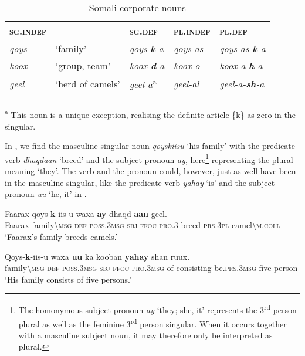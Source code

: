 \documentclass[output=paper]{langsci/langscibook}
\begin{document}
\begin{table}
\caption{Somali corporate nouns}
\label{tab:14}
\begin{tabularx}{\textwidth}{XXXXX}
\lsptoprule
{\textsc{sg.indef}} &  & {\textsc{sg.def}} & {\textsc{pl.indef}} & {\textsc{pl.def}}\\
\midrule 
{\textit{qoys}} & {‘family’} & {\textit{qoys-}\textbf{\textit{k}}\textit{-a}} & {\textit{qoys-as}} & {\textit{qoys-as-}\textbf{\textit{k}}\textit{-a}}\\
{\textit{koox}} & {‘group, team’} & {\textit{koox-}\textbf{\textit{d}}\textit{-a}} & {\textit{koox-o}} & {\textit{koox-a-}\textbf{\textit{h}}\textit{-a}}\\
{\textit{geel}} & {‘herd of camels’} & {\textit{geel-a}\textsuperscript{a}} & {\textit{geel-al}} & {\textit{geel-a-}\textbf{\textit{sh}}\textit{-a}}\\
\lspbottomrule
\end{tabularx}

\end{table} 


\textsuperscript{a} This noun is a unique exception, realising the definite article \{k\} as zero in the singular.

In , we find the masculine singular noun \textit{qoyskiisu} ‘his family’ with the predicate verb \textit{dhaqdaan} ‘breed’ and the subject pronoun \textit{ay}, here\footnote{The homonymous subject pronoun \textit{ay} ‘they; she, it’ represents the 3\textsuperscript{rd} person plural as well as the feminine 3\textsuperscript{rd} person singular. When it occurs together with a masculine subject noun, it may therefore only be interpreted as plural.} representing the plural meaning ‘they’. The verb and the pronoun could, however, just as well have been in the masculine singular, like the predicate verb \textit{yahay} ‘is’ and the subject pronoun \textit{uu} ‘he, it’ in .

\ea
\gll Faarax  qoys-\textbf{k}-iis-u        waxa  \textbf{ay}    dhaqd-\textbf{aan}  geel.\\
     Faarax  family{\textbackslash}\textsc{msg-def-poss.3msg-sbj}    \textsc{ffoc}  \textsc{pro.3}  breed-\textsc{prs.3pl}  camel{\textbackslash}\textsc{m.coll}\\
\glt ‘Faarax’s family breeds camels.’
\z

\ea
\gll Qoys-\textbf{k}-iis-u      waxa  \textbf{uu}    ka  kooban    \textbf{yahay}    shan  ruux.\\
     family{\textbackslash}\textsc{msg-def-poss.3msg-sbj}  \textsc{ffoc}  \textsc{pro.3msg}  of  consisting  be.\textsc{prs.3msg}  five  person\\
\glt ‘His family consists of five persons.’
\z
\end{document}
